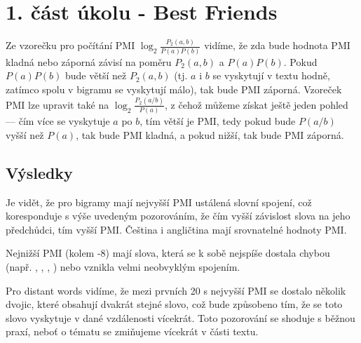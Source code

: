 \documentclass[12pt, a4paper]{report}
\theoremstyle{remark}
\begin{document}
\section*{1. část úkolu - Best Friends}

Ze vzorečku pro počítání PMI $\log_2{\frac{P_2(a,b)}{P(a)P(b)}}$ vidíme, že zda bude hodnota PMI kladná nebo záporná závisí na poměru ${P_2(a,b)}$ a ${P(a)P(b)}$. Pokud ${P(a)P(b)}$ bude větší než ${P_2(a,b)}$ (tj. $a$ i $b$ se vyskytují v textu hodně, zatímco spolu v bigramu se vyskytují málo), tak bude PMI záporná. Vzoreček PMI lze upravit také na  $\log_2{\frac{P_2(a/b)}{P(a)}}$, z čehož můžeme získat ještě jeden pohled --- čím více se vyskytuje $a$ po $b$, tím větší je PMI, tedy pokud bude $P(a/b)$ vyšší než $P(a)$, tak bude PMI kladná, a pokud nižší, tak bude PMI záporná.


\subsection*{Výsledky}



Je vidět, že pro bigramy mají nejvyšší PMI ustálená slovní spojení, což koresponduje s výše uvedeným pozorováním, že čím vyšší závislost slova na jeho předchůdci, tím vyšší PMI.
Čeština i angličtina mají srovnatelné hodnoty PMI.

Nejnižší PMI (kolem -8) mají slova, která se k sobě nejspíše dostala chybou (např. , , , ) nebo vznikla velmi neobvyklým spojením.

Pro distant words vidíme, že mezi prvních 20 s nejvyšší PMI se dostalo několik dvojic, které obsahují dvakrát stejné slovo, což bude způsobeno tím, že se toto slovo vyskytuje v dané vzdálenosti vícekrát. Toto pozorování se shoduje s běžnou praxí, neboť o tématu se zmiňujeme vícekrát v části textu.
\end{document}
